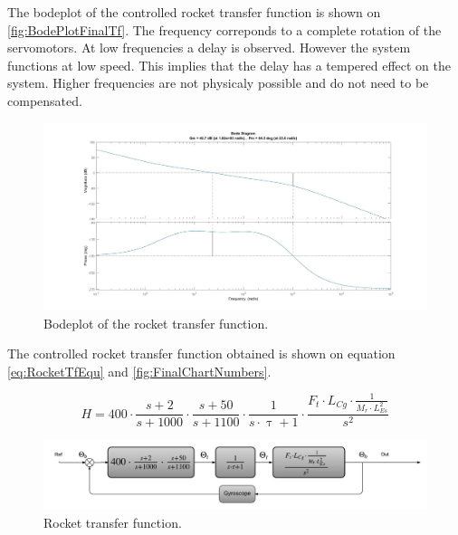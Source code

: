 The bodeplot of the controlled rocket transfer function is shown on \autoref{fig:BodePlotFinalTf}. The frequency correponds to a complete rotation of the servomotors. At low frequencies a delay is observed. However the system functions at low speed. This implies that the delay has a tempered effect on the system. Higher frequencies are not physicaly possible and do not need to be compensated.

\begin{figure}[htbp]
	\centering
		\includegraphics[width=\textwidth]{figures/Rocket/design/bodeplot}
		\caption{Bodeplot of the rocket transfer function.}
		\label{fig:BodeplotFinalTf}
\end{figure}

The controlled rocket transfer function obtained is shown on equation \autoref{eq:RocketTfEqu} and  \autoref{fig:FinalChartNumbers}.

\begin{equation}    
H = 400 \cdot \frac{s + 2}{s + 1000} \cdot \frac{s + 50}{s + 1100} \cdot \frac{1}{s \cdot \uptau + 1} \cdot \frac{F_t \cdot L_{Cg} \cdot \frac{1}{M_r \cdot L_{Es}^2}}{s^2}  
\end{equation}
\label{eq:RocketTfEqu}

\begin{figure}[htbp]
	\centering
	
	\includegraphics[width=\textwidth]{figures/Rocket/design/final_chart_number}
	\caption{Rocket transfer function.}
	\label{fig:FinalChartNumbers}
	
\end{figure}